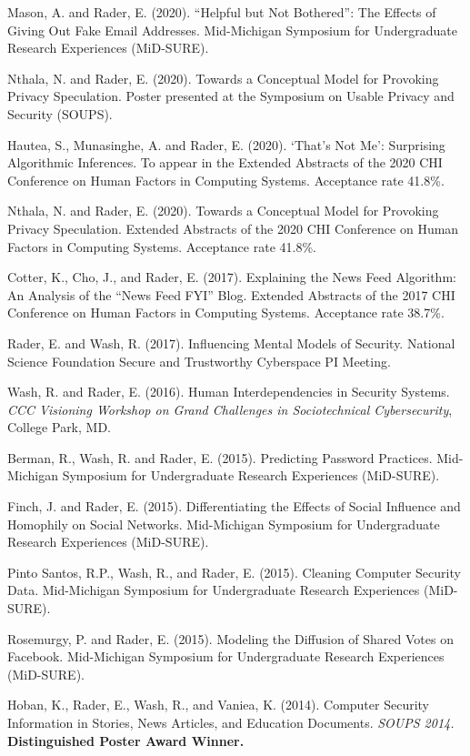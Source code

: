 \documentclass[9pt]{extarticle}
\begin{document}
Mason, A. and Rader, E. (2020). ``Helpful but Not Bothered'': The Effects of Giving Out Fake Email Addresses. Mid-Michigan Symposium for Undergraduate Research Experiences (MiD-SURE).

Nthala, N. and Rader, E. (2020). Towards a Conceptual Model for Provoking Privacy Speculation. Poster presented at the Symposium on Usable Privacy and Security (SOUPS).

Hautea, S., Munasinghe, A. and Rader, E. (2020). `That's Not Me': Surprising Algorithmic Inferences. To appear in the Extended Abstracts of the 2020 CHI Conference on Human Factors in Computing Systems. Acceptance rate 41.8\%.

Nthala, N. and Rader, E. (2020). Towards a Conceptual Model for Provoking Privacy Speculation. Extended Abstracts of the 2020 CHI Conference on Human Factors in Computing Systems. Acceptance rate 41.8\%.

Cotter, K., Cho, J., and Rader, E. (2017). Explaining the News Feed Algorithm: An Analysis of the ``News Feed FYI'' Blog. Extended Abstracts of the 2017 CHI Conference on Human Factors in Computing Systems. Acceptance rate 38.7\%.

Rader, E. and Wash, R. (2017). Influencing Mental Models of Security. National Science Foundation Secure and Trustworthy Cyberspace PI Meeting.

Wash, R. and Rader, E. (2016). Human Interdependencies in Security Systems. \emph{CCC Visioning Workshop on Grand Challenges in Sociotechnical Cybersecurity}, College Park, MD.

Berman, R., Wash, R. and Rader, E. (2015). Predicting Password Practices. Mid-Michigan Symposium for Undergraduate Research Experiences (MiD-SURE).

Finch, J. and Rader, E. (2015). Differentiating the Effects of Social Influence and Homophily on Social Networks. Mid-Michigan Symposium for Undergraduate Research Experiences (MiD-SURE).

Pinto Santos, R.P., Wash, R., and Rader, E. (2015). Cleaning Computer Security Data. Mid-Michigan Symposium for Undergraduate Research Experiences (MiD-SURE).

Rosemurgy, P. and Rader, E. (2015). Modeling the Diffusion of Shared Votes on Facebook. Mid-Michigan Symposium for Undergraduate Research Experiences (MiD-SURE).

Hoban, K., Rader, E., Wash, R., and Vaniea, K. (2014). Computer Security Information in Stories, News Articles, and Education Documents. \emph{SOUPS 2014.} \textbf{Distinguished Poster Award Winner.}
\end{document}
